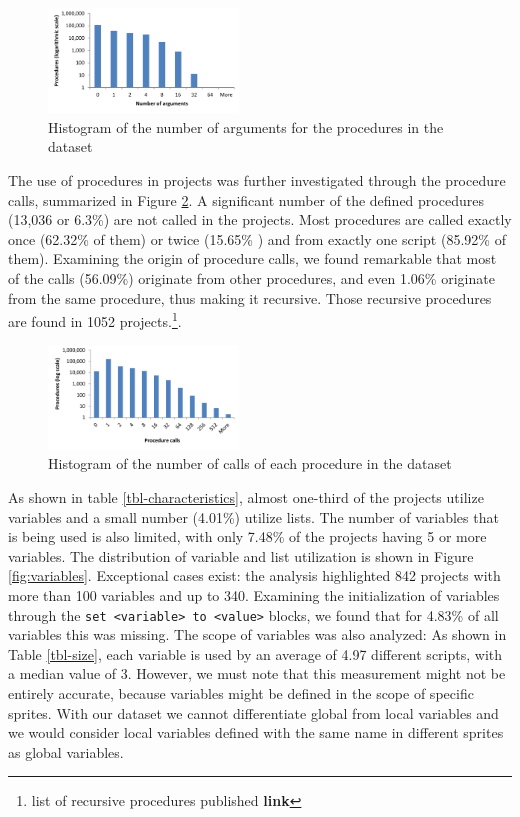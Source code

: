 \documentclass{sig-alternate}
\newcommand{\todo}[1]{\textbf{#1}}
\begin{document}
\begin{figure}
	\centering
	\includegraphics[width=0.45\textwidth]{fig/charts/5arguments}
	\caption{Histogram of the number of arguments for the procedures in the dataset}
	\label{fig:procedurearguments}
\end{figure}

The use of procedures in projects was further investigated through the procedure calls, summarized in Figure \ref{fig:procedurecalls}. A significant number of the defined procedures (13,036 or 6.3\%) are not called in the projects. Most procedures are called exactly once (62.32\% of them) or twice (15.65\% ) and from exactly one script (85.92\% of them). Examining the origin of procedure calls, we found remarkable that most of the calls (56.09\%) originate from other procedures, and even 1.06\% originate from the same procedure, thus making it recursive. Those recursive procedures are found in 1052 projects.\footnote{list of recursive procedures published \todo{link}}.

\begin{figure}
	\centering
	\includegraphics[width=0.45\textwidth]{fig/charts/7procedurecalls}
	\caption{Histogram of the number of calls of each procedure in the dataset}
	\label{fig:procedurecalls}
\end{figure}

As shown in table \ref{tbl-characteristics}, almost one-third of the projects utilize variables and a small number (4.01\%) utilize lists. The number of variables that is being used is also limited, with only 7.48\% of the projects having 5 or more variables. The distribution of variable and list utilization is shown in Figure \ref{fig:variables}. Exceptional cases exist: the analysis highlighted 842 projects with more than 100 variables and up to 340. Examining the initialization of variables through the \texttt{set <variable> to <value>} blocks, we found that for 4.83\% of all variables this was missing. The scope of variables was also analyzed: As shown in Table \ref{tbl-size}, each variable is used by an average of 4.97 different scripts, with a median value of 3. However, we must note that this measurement might not be entirely accurate, because variables might be defined in the scope of specific sprites. With our dataset we cannot differentiate global from local variables and we would consider local variables defined with the same name in different sprites as global variables.
\end{document}
